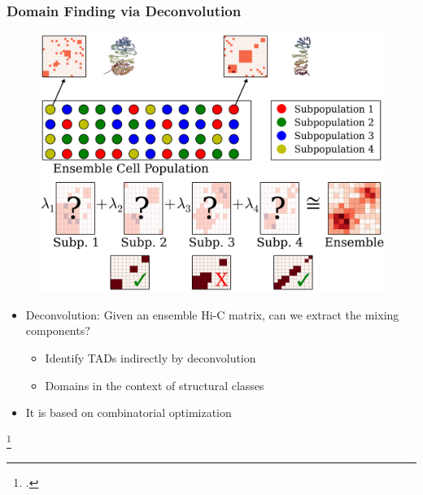 \documentclass[12pt]{beamer}
\begin{document}
\begin{frame}
\frametitle{Domain Finding via Deconvolution}

\begin{figure}
\includegraphics[scale=0.25]{decon_ex.png}
\end{figure}

\begin{itemize}
\item Deconvolution: Given an ensemble Hi-C matrix, can we extract the mixing
  components?
\begin{itemize}
\item Identify TADs indirectly by deconvolution
\vspace{0.05cm}
\item Domains in the context of structural classes
\end{itemize}
\vspace{0.1cm}
\item It is based on combinatorial optimization
\end{itemize}

\footcitetext{decon2015}

\end{frame}
\end{document}
